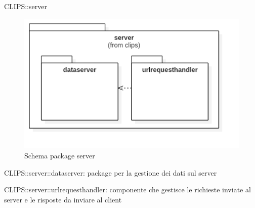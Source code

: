 \begin{componente}{CLIPS::server}
\begin{figure}[h!] 
\centering 
\includegraphics[scale=0.4]{img/package/png/server.png} 
\caption{Schema package server} 
 \end{figure} 
\begin{compPackageContenuti}
\item CLIPS::server::dataserver: package per la gestione dei dati sul server
\item CLIPS::server::urlrequesthandler: componente che gestisce le richieste inviate al server e le risposte da inviare al client
\end{compPackageContenuti}
\end{componente}

